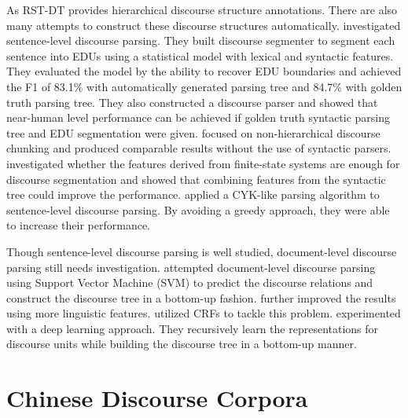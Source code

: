 As RST-DT provides hierarchical discourse structure annotations. There are also many
attempts to construct these discourse structures automatically. \cite{soricut2003sentence}
investigated sentence-level discourse parsing. They built discourse segmenter to
segment each sentence into EDUs using a statistical model with lexical and syntactic features.
They evaluated the model by the ability to recover EDU boundaries and achieved the F1 of
83.1\% with automatically generated parsing tree and 84.7\% with golden truth parsing tree.
They also constructed a discourse parser and showed that near-human level performance can be achieved
if golden truth syntactic parsing tree and EDU segmentation were given. \cite{sporleder2005} focused
on non-hierarchical discourse chunking and produced comparable results without the use of
syntactic parsers. \cite{fisher2007utility} investigated whether the features derived from finite-state
systems are enough for discourse segmentation and showed that combining features from the syntactic tree
could improve the performance. \cite{joty2012novel} applied a CYK-like parsing algorithm
to sentence-level discourse parsing. By avoiding a greedy approach, they were able to increase
their performance.

Though sentence-level discourse parsing is well studied, document-level discourse
parsing still needs investigation. \cite{hernault2010hilda} attempted
document-level discourse parsing using Support Vector Machine (SVM) to
predict the discourse relations and construct the discourse tree in
a bottom-up fashion. \cite{feng2012text} further improved the results using more
linguistic features. \cite{joty2013combining} utilized CRFs to tackle this problem.
\cite{li2014recursive} experimented with a deep learning approach.
They recursively learn the representations for discourse units
while building the discourse tree in a bottom-up manner.


\section{Chinese Discourse Corpora}

